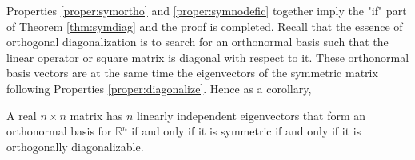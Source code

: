 \par
Properties \ref{proper:symortho} and \ref{proper:symnodefic} together imply the "if" part of Theorem \ref{thm:symdiag} and the proof is completed. Recall that the essence of orthogonal diagonalization is to search for an orthonormal basis such that the linear operator or square matrix is diagonal with respect to it. These orthonormal basis vectors are at the same time the eigenvectors of the symmetric matrix following Properties \ref{proper:diagonalize}. Hence as a corollary,
\begin{proper}
\label{proper:orthobasissym}
A real $n \times n$ matrix has $n$ linearly independent eigenvectors that form an orthonormal basis for $\mathbb{R}^n$ if and only if it is symmetric if and only if it is orthogonally diagonalizable.
\end{proper}

